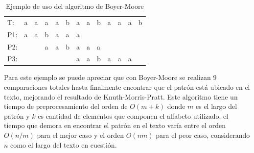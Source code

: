 \begin{table}[h]
\centering
\label{my-label7}
\begin{tabular}{lllllllllllll}
\cline{2-13}
\multicolumn{1}{l|}{T:}  & \multicolumn{1}{l|}{a}                         & \multicolumn{1}{l|}{a}                         & \multicolumn{1}{l|}{a}                         & \multicolumn{1}{l|}{a}                         & \multicolumn{1}{l|}{b}                         & \multicolumn{1}{l|}{a}                         & \multicolumn{1}{l|}{a}                         & \multicolumn{1}{l|}{b}                         & \multicolumn{1}{l|}{a}                         & \multicolumn{1}{l|}{a}                         & \multicolumn{1}{l|}{a}                         & \multicolumn{1}{l|}{b} \\ \cline{2-13} 
\multicolumn{1}{l}{P1:} & \multicolumn{1}{l}{a} & \multicolumn{1}{l}{a} & \multicolumn{1}{l}{b} & \multicolumn{1}{l}{a} & \multicolumn{1}{l}{\cellcolor[HTML]{FD6864}a} & \multicolumn{1}{l}{\cellcolor[HTML]{9AFF99}a} &                    &       &                       &        &                       &                        \\
P2:                      &                       &  & \multicolumn{1}{l}{a} & \multicolumn{1}{l}{a} & \multicolumn{1}{l}{b} & \multicolumn{1}{l}{a} & \multicolumn{1}{l}{a} & \multicolumn{1}{l}{\cellcolor[HTML]{FD6864}a} &              &               &                     &                        \\
P3:                      &                       &                       &                        &                      &  & \multicolumn{1}{l}{\cellcolor[HTML]{9AFF99}a} & \multicolumn{1}{l}{\cellcolor[HTML]{9AFF99}a} & \multicolumn{1}{l}{\cellcolor[HTML]{9AFF99}b} & \multicolumn{1}{l}{\cellcolor[HTML]{9AFF99}a} & \multicolumn{1}{l}{\cellcolor[HTML]{9AFF99}a} & \multicolumn{1}{l}{\cellcolor[HTML]{9AFF99}a} &                        \\
\end{tabular}
\caption{Ejemplo de uso del algoritmo de Boyer-Moore}
\end{table}

Para este ejemplo se puede apreciar que con Boyer-Moore se realizan 9 comparaciones totales hasta finalmente encontrar que el patrón está ubicado en el texto, mejorando el resultado de Knuth-Morris-Pratt.
Este algoritmo tiene un tiempo de preprocesamiento del orden de $O(m+k)$ donde $m$ es el largo del patrón y $k$ es cantidad de elementos que componen el alfabeto utilizado; el tiempo que demora en encontrar el patrón en el texto varía entre el orden $O(n/m)$ para el mejor caso y el orden $O(nm)$ para el peor caso, considerando $n$ como el largo del texto en cuestión.

